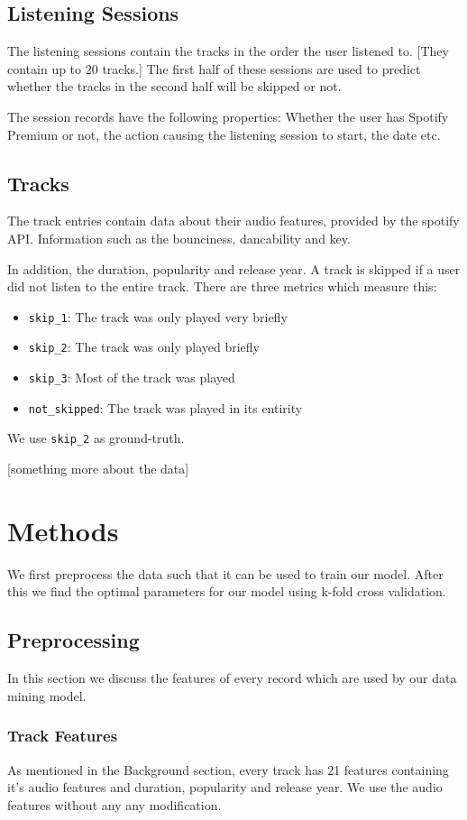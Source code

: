 \documentclass[conference]{IEEEtran}
\begin{document}
\subsection{Listening Sessions}
The listening sessions contain the tracks in the order the user listened to. [They contain up to 20 tracks.]
The first half of these sessions are used to predict whether the tracks in the second half will be skipped or not. 

The session records have the following properties: 
Whether the user has Spotify Premium or not, 
the action causing the listening session to start, 
the date etc. 

\subsection{Tracks}
The track entries contain data about their audio features, 
provided by the spotify API\@. 
Information such as the bounciness, dancability and key.

In addition, the duration, popularity and release year.
A track is skipped if a user did not listen to the entire track. There are three metrics which measure this: 
\begin{itemize}
	\item \verb|skip_1|: The track was only played very briefly
	\item \verb|skip_2|: The track was only played briefly
	\item \verb|skip_3|: Most of the track was played
	\item \verb|not_skipped|: The track was played in its entirity
\end{itemize}
We use \verb|skip_2| as ground-truth.

[something more about the data]

\section{Methods}
We first preprocess the data such that it can be used to train our model.
After this we find the optimal parameters for our model using k-fold cross validation.

\subsection{Preprocessing}
In this section we discuss the features of every record which are used by our data mining model.

\subsubsection{Track Features}
As mentioned in the Background section, every track has 21 features containing 
it's audio features and duration, popularity and release year. 
We use the audio features without any any modification.
\end{document}
